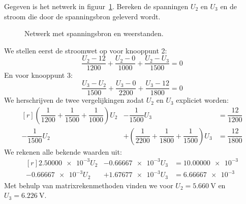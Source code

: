 \begin{example}
Gegeven is het netwerk in figuur~\ref{fig:gelnetwerkvoornodalanalysis3}. Bereken de spanningen $U_2$ en $U_3$ en de stroom die door de spanningsbron geleverd wordt.
\begin{figure}[H]
\centering
{}
\caption{Netwerk met spanningsbron en weerstanden.}
\label{fig:gelnetwerkvoornodalanalysis3}
\end{figure}
We stellen eerst de stroomwet op voor knooppunt 2:
%
\begin{equation}
\dfrac{U_2-12}{1200} + \dfrac{U_2-0}{1000} + \dfrac{U_2-U_3}{1500} = 0
\end{equation}
%
En voor knooppunt 3:
%
\begin{equation}
\dfrac{U_3-U_2}{1500} + \dfrac{U_3-0}{2200} + \dfrac{U_3-12}{1800} = 0
\end{equation}
%
We herschrijven de twee vergelijkingen zodat $U_2$ en $U_3$ expliciet worden:
%
\begin{equation}
\begin{matrix*}[r]
\left(\dfrac{1}{1200} + \dfrac{1}{1500} + \dfrac{1}{1000}\right)U_2 & - \dfrac{1}{1500}U_3 &= \dfrac{12}{1200} \\[1em]
- \dfrac{1}{1500}U_2 & + \left(\dfrac{1}{2200} + \dfrac{1}{1800} + \dfrac{1}{1500}\right)U_3 & = \dfrac{12}{1800}
\end{matrix*}
\end{equation}
%
We rekenen alle bekende waarden uit:
%
\begin{equation}
\begin{matrix*}[r]
\num{2.50000e-3}U_2 & -\num{0.66667e-3}U_3 &= \num{10.00000e-3} \\
\num{-0.66667e-3}U_2 & + \num{1,67677e-3}U_3 &= \num{6.66667e-3}
\end{matrix*}
\end{equation}
%
Met behulp van matrixrekenmethoden vinden we voor $U_2 = \SI{5.660}{\volt}$ en $U_3 = \SI{6.226}{\volt}$.

\end{example}
